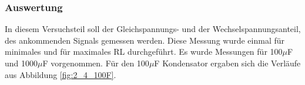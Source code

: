 \documentclass[12pt,a4paper]{article}
\begin{document}
\subsubsection{Auswertung}

In diesem Versuchsteil soll der Gleichspannungs- und der Wechselspannungsanteil, des ankommenden Signals gemessen werden. Diese Messung wurde einmal für minimales und für maximales RL durchgeführt. Es wurde Messungen für 100$\mu$F und 1000$\mu$F vorgenommen. Für den 100$\mu$F Kondensator ergaben sich die Verläufe aus Abbildung \ref{fig:2_4_100F}.
\end{document}
